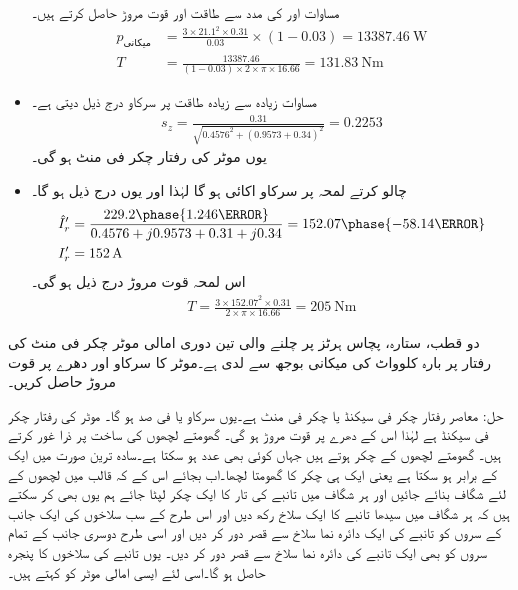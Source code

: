 \begin{itemize}
مساوات   اور   کی مدد سے طاقت اور قوت مروڑ حاصل کرتے ہیں۔
\begin{align*}
p_{\text{میکانی}}&=\frac{3\times 21.1^2\times 0.31}{0.03} \times (1-0.03)=\SI{13387.46}{\watt}\\
T&=\frac{13387.46}{(1-0.03) \times 2\times \pi \times 16.66}=\SI{131.83}{\newton \meter}
\end{align*}
%
\item
مساوات  زیادہ سے زیادہ طاقت پر سرکاو درج ذیل دیتی ہے۔
\begin{align*}
s_z=\frac{0.31}{\sqrt{0.4576^2+(0.9573+0.34)^2}}=0.2253
\end{align*}
یوں موٹر کی رفتار  چکر فی منٹ  ہو گی۔
\item
چالو کرتے لمحہ پر سرکاو اکائی ہو گا لہٰذا  اور یوں درج ذیل ہو گا۔
\begin{align*}
\hat{I}_r'&=\frac{229.2 \phase{1.246\degree}}{0.4576+j 0.9573+0.31+j 0.34}=152.07\phase{-58.14\degree}\\
I_r'&=\SI{152}{\ampere}
\end{align*}
اس لمحہ قوت مروڑ درج ذیل ہو گی۔
\begin{align*}
T=\frac{3 \times 152.07^2 \times 0.31}{2 \times \pi \times 16.66}=\SI{205}{\newton \meter}
\end{align*}
\end{itemize}
%
دو قطب، ستارہ،  پچاس ہرٹز پر چلنے والی تین دوری امالی موٹر   چکر فی منٹ کی رفتار پر بارہ کلوواٹ کی میکانی بوجھ سے لدی ہے۔موٹر کا سرکاو اور دھرے پر قوت مروڑ  حاصل کریں۔

حل:\quad
معاصر رفتار  چکر فی سیکنڈ یا  چکر فی منٹ ہے۔یوں سرکاو   یا  فی صد ہو گا۔ موٹر کی رفتار   چکر فی سیکنڈ ہے لہٰذا اس کے  دھرے پر قوت مروڑ   ہو گی۔
%
گھومتے لچھوں کی ساخت پر ذرا غور کرتے ہیں۔ گھومتے لچھوں کے   چکر ہوتے ہیں جہاں  کوئی بھی عدد ہو سکتا ہے۔سادہ ترین صورت میں   ایک کے برابر ہو سکتا ہے یعنی ایک ہی چکر کا گھومتا لچھا۔اب بجائے اس کے کہ قالب میں لچھوں کے لئے شگاف بنائے جائیں اور ہر شگاف میں تانبے کی تار کا ایک چکر لپٹا جائے ہم یوں بھی کر سکتے ہیں کہ ہر شگاف میں سیدھا تانبے کا ایک سلاخ رکھ دیں اور اس طرح کے سب سلاخوں کی ایک جانب کے سروں کو تانبے کی ایک دائرہ نما سلاخ سے قصر دور کر دیں اور اسی طرح دوسری جانب کے تمام سروں کو بھی ایک تانبے کی دائرہ نما سلاخ سے قصر  دور کر دیں۔ یوں تانبے کی سلاخوں کا پنجرہ حاصل ہو گا۔اسی لئے ایسی امالی موٹر کو  کہتے ہیں۔

